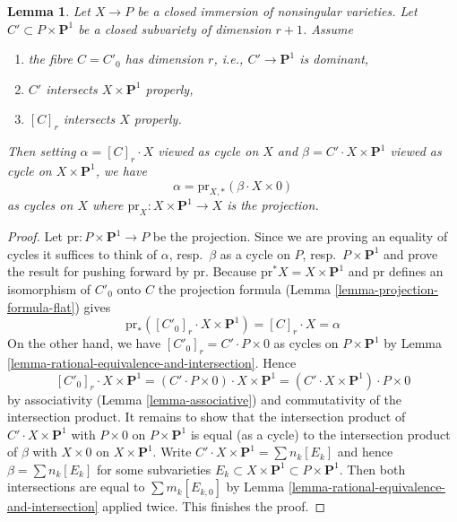 \documentclass{stacks-project}
\theoremstyle{plain}
\newtheorem{lemma}[subsection]{Lemma}
\theoremstyle{definition}
\theoremstyle{remark}
\numberwithin{equation}{subsection}
\begin{document}
\begin{lemma}
\label{lemma-transfer}
Let $X \to P$ be a closed immersion of nonsingular varieties.
Let $C' \subset P \times \mathbf{P}^1$ be a closed subvariety of dimension
$r + 1$. Assume
\begin{enumerate}
\item the fibre $C = C'_0$ has dimension $r$, i.e., $C' \to \mathbf{P}^1$
is dominant,
\item $C'$ intersects $X \times \mathbf{P}^1$ properly,
\item $[C]_r$ intersects $X$ properly.
\end{enumerate}
Then setting $\alpha = [C]_r \cdot X$ viewed as cycle on $X$ and
$\beta = C' \cdot X \times \mathbf{P}^1$ viewed as cycle on
$X \times \mathbf{P}^1$, we have
$$
\alpha = \text{pr}_{X, *}(\beta \cdot X \times 0)
$$
as cycles on $X$ where $\text{pr}_X : X \times \mathbf{P}^1 \to X$ is the
projection.
\end{lemma}

\begin{proof}
Let $\text{pr} : P \times \mathbf{P}^1 \to P$ be the projection.
Since we are proving an equality of cycles it suffices to think of
$\alpha$, resp.\ $\beta$ as a cycle on $P$, resp.\ $P \times \mathbf{P}^1$
and prove the result for pushing forward by $\text{pr}$.
Because $\text{pr}^*X = X \times \mathbf{P}^1$ and
$\text{pr}$ defines an isomorphism of $C'_0$ onto $C$
the projection formula (Lemma \ref{lemma-projection-formula-flat})
gives
$$
\text{pr}_*([C'_0]_r \cdot X \times \mathbf{P}^1) = [C]_r \cdot X = \alpha
$$
On the other hand, we have $[C'_0]_r = C' \cdot P \times 0$
as cycles on $P \times \mathbf{P}^1$
by Lemma \ref{lemma-rational-equivalence-and-intersection}.
Hence
$$
[C'_0]_r \cdot X \times \mathbf{P}^1 =
(C' \cdot P \times 0) \cdot X \times \mathbf{P}^1 =
(C' \cdot X \times \mathbf{P}^1) \cdot P \times 0
$$
by associativity (Lemma \ref{lemma-associative}) and commutativity of the
intersection product. It remains to show that the intersection product of
$C' \cdot X \times \mathbf{P}^1$ with $P \times 0$ on
$P \times \mathbf{P}^1$ is equal (as a cycle) to the intersection product of
$\beta$ with $X \times 0$ on $X \times \mathbf{P}^1$. Write
$C' \cdot X \times \mathbf{P}^1 = \sum n_k[E_k]$ and hence
$\beta = \sum n_k[E_k]$ for some subvarieties
$E_k \subset X \times \mathbf{P}^1 \subset P \times \mathbf{P}^1$.
Then both intersections are equal to $\sum m_k[E_{k, 0}]$ by
Lemma \ref{lemma-rational-equivalence-and-intersection} applied twice.
This finishes the proof.
\end{proof}
\end{document}
